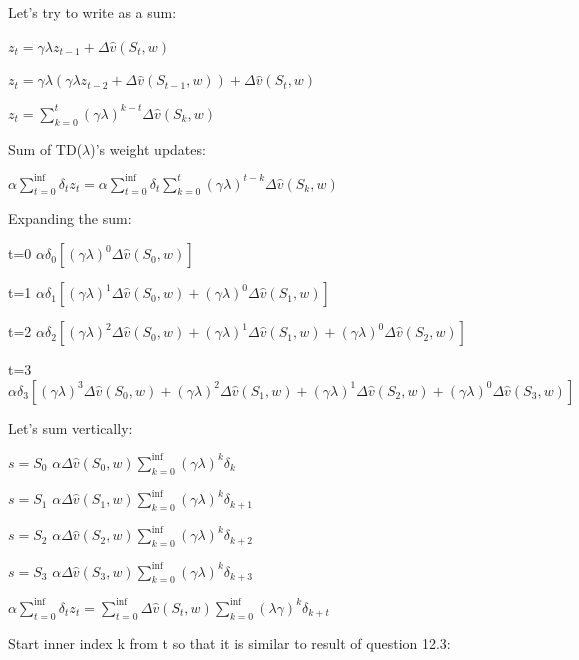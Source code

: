 \documentclass[11pt]{article}
\begin{document}
    \hfill \break
    \noindent Let's try to write as a sum:

    \noindent $ z_{t} = \gamma \lambda z_{t-1} + \Delta \hat{v}(S_t, w) $

    \noindent $ z_{t} = \gamma \lambda ( \gamma \lambda z_{t-2} + \Delta \hat{v}(S_{t-1}, w) ) + \Delta \hat{v}(S_t, w) $

    \noindent $ z_{t} = \sum_{k=0}^{t} (\gamma \lambda )^{k-t} \Delta \hat{v}(S_k, w) $


    \hfill \break
    \noindent Sum of TD($\lambda$)’s weight updates:

    \noindent $ \alpha \sum_{t=0}^{\inf} \delta_t z_t = \alpha \sum_{t=0}^{\inf} \delta_t \sum_{k=0}^{t} (\gamma \lambda )^{t-k} \Delta \hat{v}(S_k, w) $

    \hfill \break
    \noindent Expanding the sum:

    \noindent t=0 $ \alpha \delta_0 [(\gamma \lambda)^0 \Delta\hat{v}(S_0, w)] $

    \noindent t=1 $ \alpha \delta_1 [(\gamma \lambda)^1 \Delta\hat{v}(S_0, w) + (\gamma \lambda)^0 \Delta\hat{v}(S_1, w) ] $

    \noindent t=2 $ \alpha \delta_2 [(\gamma \lambda)^2 \Delta\hat{v}(S_0, w) + (\gamma \lambda)^1 \Delta\hat{v}(S_1, w) + (\gamma \lambda)^0 \Delta\hat{v}(S_2, w) ] $

    \noindent t=3 $ \alpha \delta_3 [(\gamma \lambda)^3 \Delta\hat{v}(S_0, w) + (\gamma \lambda)^2 \Delta\hat{v}(S_1, w) + (\gamma \lambda)^1 \Delta\hat{v}(S_2, w) + (\gamma \lambda)^0 \Delta\hat{v}(S_3, w) ] $

    \hfill \break
    \noindent Let's sum vertically:

    \noindent $s = S_0$ $ \alpha \Delta\hat{v}(S_0, w) \sum_{k=0}^{\inf} (\gamma \lambda)^{k} \delta_{k} $

    \noindent $s = S_1$ $ \alpha \Delta\hat{v}(S_1, w) \sum_{k=0}^{\inf} (\gamma \lambda)^{k} \delta_{k+1} $

    \noindent $s = S_2$ $ \alpha \Delta\hat{v}(S_2, w) \sum_{k=0}^{\inf} (\gamma \lambda)^{k} \delta_{k+2} $

    \noindent $s = S_3$ $ \alpha \Delta\hat{v}(S_3, w) \sum_{k=0}^{\inf} (\gamma \lambda)^{k} \delta_{k+3} $

    \hfill \break
    \noindent $  \alpha \sum_{t=0}^{\inf} \delta_t z_t =  \sum_{t=0}^{\inf} \Delta\hat{v}(S_t, w) \sum_{k=0}^{\inf} (\lambda \gamma)^k \delta_{k+t} $

    \hfill \break
    \noindent Start inner index k from t so that it is similar to result of question 12.3:
\end{document}
